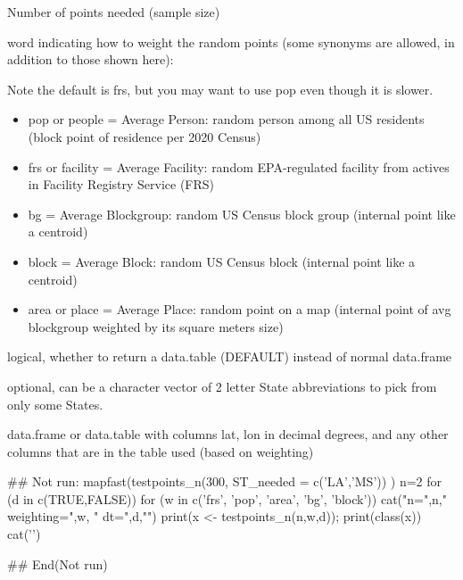 \documentclass[a4paper]{book}
\begin{document}
%
\begin{Arguments}
\begin{ldescription}
\item[\code{n}] Number of points needed (sample size)

\item[\code{weighting}] word indicating how to weight the random points (some synonyms are allowed, in addition to those shown here):

Note the default is frs, but you may want to use pop even though it is slower.
\begin{itemize}

\item{} pop or people = Average Person: random person among all US residents (block point of residence per 2020 Census)
\item{} frs or facility = Average Facility: random EPA-regulated facility from actives in Facility Registry Service (FRS)
\item{} bg = Average Blockgroup: random US Census block group (internal point like a centroid)
\item{} block = Average Block: random US Census block (internal point like a centroid)
\item{} area or place = Average Place: random point on a map (internal point of avg blockgroup weighted by its square meters size)

\end{itemize}


\item[\code{dt}] logical, whether to return a data.table (DEFAULT) instead of normal data.frame

\item[\code{ST\_needed}] optional, can be a character vector of 2 letter State abbreviations to pick from only some States.
\end{ldescription}
\end{Arguments}
%
\begin{Value}
data.frame or data.table with columns lat, lon in decimal degrees, and
any other columns that are in the table used (based on weighting)
\end{Value}
%
\begin{Examples}
\begin{ExampleCode}
## Not run: 
mapfast(testpoints_n(300, ST_needed = c('LA','MS')) )
n=2
for (d in c(TRUE,FALSE)) {
  for (w in c('frs', 'pop', 'area', 'bg', 'block')) {
    cat("n=",n,"  weighting=",w, "  dt=",d,"\n\n")
    print(x <- testpoints_n(n,w,d)); print(class(x))
    cat('\n')
  }
}

## End(Not run)
 
\end{ExampleCode}
\end{Examples}
\end{document}
